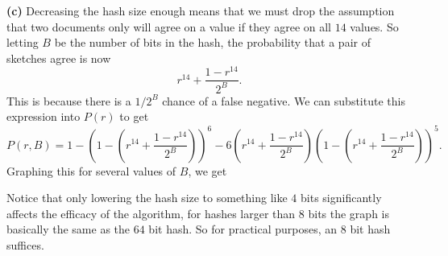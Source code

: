 \documentclass[11pt,letterpaper]{article}
\begin{document}
\begin{solution}
    \textbf{(c)} Decreasing the hash size enough means that we must drop the assumption that two documents only will agree on a value if they agree on all $14$ values. So letting $B$ be the number of bits in the hash, the probability that a pair of sketches agree is now
    \[
        r^{14}+\frac{1-r^{14}}{2^B}.
    \] 
    This is because there is a $1/2^B$ chance of a false negative. We can substitute this expression into $P(r)$ to get
    \[
        P(r,B)=1-\left(1-\left(r^{14}+\frac{1-r^{14}}{2^B}\right)\right)^6-6\left(r^{14}+\frac{1-r^{14}}{2^B}\right)\left(1-\left(r^{14}+\frac{1-r^{14}}{2^B}\right)\right)^5
    .\]  
    Graphing this for several values of $B$, we get
    \begin{center}
    \end{center}
    Notice that only lowering the hash size to something like $4$ bits significantly affects the efficacy of the algorithm, for hashes larger than $8$ bits the graph is basically the same as the $64$ bit hash. So for practical purposes, an $8$ bit hash suffices.
\end{solution}
\end{document}
